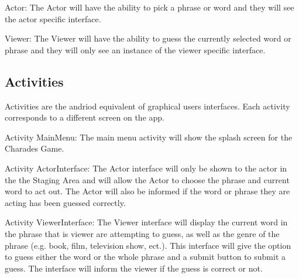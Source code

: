 \documentclass{article}
\begin{document}
Actor: The Actor will have the ability to pick a phrase or word and they will see the actor specific interface.

Viewer: The Viewer will have the ability to guess the currently selected word or phrase and they will only see an  instance of the viewer specific interface.

\subsection{Activities}
Activities are the andriod equivalent of graphical users interfaces. Each activity corresponds to a different screen on the app.

Activity MainMenu: The main menu activity will show the splash screen for the Charades Game.

Activity ActorInterface: The Actor interface will only be shown to the actor in the the Staging Area and will allow the Actor to choose the phrase and current word to act out. The Actor will also be informed if the word or phrase they are acting has been guessed correctly.

Activity ViewerInterface: The Viewer interface will display the current word in the phrase that is viewer are attempting to guess, as well as the genre of the phrase (e.g. book, film, television show, ect.). This interface will give the option to guess either the word or the whole phrase and a submit button to submit a guess. The interface will inform the viewer if the guess is correct or not.
\end{document}
